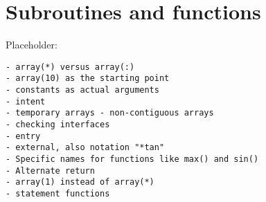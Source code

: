 \section{Subroutines and functions}
Placeholder:
\begin{verbatim}
- array(*) versus array(:)
- array(10) as the starting point
- constants as actual arguments
- intent
- temporary arrays - non-contiguous arrays
- checking interfaces
- entry
- external, also notation "*tan"
- Specific names for functions like max() and sin()
- Alternate return
- array(1) instead of array(*)
- statement functions

\end{verbatim}
